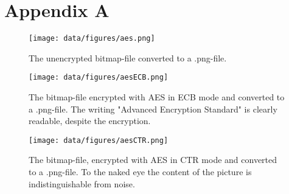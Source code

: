 \chapter{Appendix A}
\label{ch:appendixa}

\begin{figure}[h]
\centering
\texttt{[image: data/figures/aes.png]}
\caption{The unencrypted bitmap-file converted to a .png-file.}
\label{fig:aespng}
\end{figure}

\begin{figure}[h]
\centering
\texttt{[image: data/figures/aesECB.png]}
\caption{The bitmap-file encrypted with AES in ECB mode and converted to a .png-file. The writing "Advanced Encryption Standard" is clearly readable, despite the encryption.}
\label{fig:aesecbpng}
\end{figure}

\begin{figure}[h]
\centering
\texttt{[image: data/figures/aesCTR.png]}
\caption{The bitmap-file, encrypted with AES in CTR mode and converted to a .png-file. To the naked eye the content of the picture is indistinguishable from noise.}
\label{fig:aesctrpng}
\end{figure}


